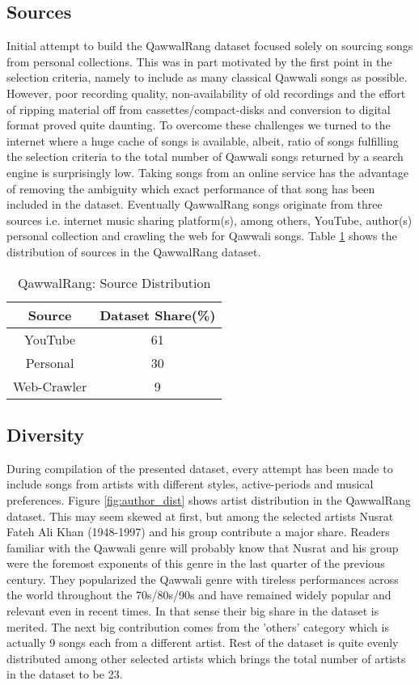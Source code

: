 \documentclass{article}
\begin{document}
\subsection{Sources}
Initial attempt to build the QawwalRang dataset focused solely on sourcing songs from personal collections. This was in part motivated by the first point in the selection criteria, namely to include as many classical Qawwali songs as possible. However, poor recording quality, non-availability of old recordings and the effort of ripping material off from cassettes/compact-disks and conversion to digital format proved quite daunting. To overcome these challenges we turned to the internet where a huge cache of songs is available, albeit, ratio of songs fulfilling the selection criteria to the total number of Qawwali songs returned by a search engine is surprisingly low. Taking songs from an online service has the advantage of removing the ambiguity which exact performance of that song has been included in the dataset. Eventually QawwalRang songs originate from three sources i.e. internet music sharing platform(s), among others, YouTube, author(s) personal collection and crawling the web for Qawwali songs. Table \ref{tab:sources} shows the distribution of sources in the QawwalRang dataset.
\begin{table}[htpb]
\centering
  \begin{tabular}{|c | c|}
  \toprule
  \bfseries Source & \bfseries Dataset Share(\%) \\
  \hline \hline
  YouTube  & 61 \\
  \hline
  Personal & 30 \\
  \hline
  Web-Crawler & 9  \\
  \bottomrule
  \end{tabular}
  \caption{QawwalRang: Source Distribution}
\label{tab:sources}
\end{table}

\subsection{Diversity}

During compilation of the presented dataset, every attempt has been made to include songs from artists with different styles, active-periods and musical preferences. Figure \ref{fig:author_dist} shows artist distribution in the QawwalRang dataset. This may seem skewed at first, but among the selected artists Nusrat Fateh Ali Khan (1948-1997) \citep{nusrat} and his group contribute a major share. Readers familiar with the Qawwali genre will probably know that Nusrat and his group were the foremost exponents of this genre in the last quarter of the previous century. They popularized the Qawwali genre with tireless performances across the world throughout the 70s/80s/90s and have remained widely popular and relevant even in recent times. In that sense their big share in the dataset is merited. The next big contribution comes from the 'others' category which is actually 9 songs each from a different artist. Rest of the dataset is quite evenly distributed among other selected artists which brings the total number of artists in the dataset to be 23.
\end{document}
